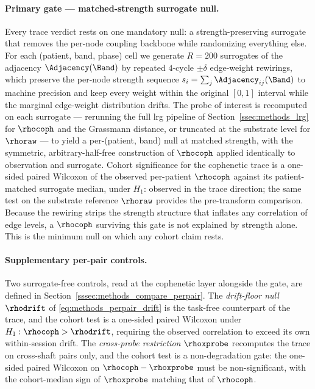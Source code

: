\paragraph{Primary gate --- matched-strength surrogate null.}
Every trace verdict rests on one mandatory null: a strength-preserving surrogate that removes the per-node coupling backbone while randomizing everything else. For each (patient, band, phase) cell we generate \(R = 200\) surrogates of the adjacency \(\Adjacency(\Band)\) by repeated \(4\)-cycle \(\pm\delta\) edge-weight rewirings, which preserve the per-node strength sequence \(s_{i} = \sum_{j} \Adjacency_{ij}(\Band)\) to machine precision and keep every weight within the original \([0, 1]\) interval while the marginal edge-weight distribution drifts. The probe of interest is recomputed on each surrogate --- rerunning the full \gls{lrg} pipeline of Section~\ref{ssec:methods_lrg} for \(\rhocoph\) and the Grassmann distance, or truncated at the substrate level for \(\rhoraw\) --- to yield a per-(patient, band) null at matched strength, with the symmetric, arbitrary-half-free construction of \(\rhocoph\) applied identically to observation and surrogate. Cohort significance for the cophenetic trace is a one-sided paired Wilcoxon of the observed per-patient \(\rhocoph\) against its patient-matched surrogate median, under \(H_{1}\): observed in the trace direction; the same test on the substrate reference \(\rhoraw\) provides the pre-transform comparison. Because the rewiring strips the strength structure that inflates any correlation of edge levels, a \(\rhocoph\) surviving this gate is not explained by strength alone. This is the minimum null on which any cohort claim rests.

\paragraph{Supplementary per-pair controls.}
Two surrogate-free controls, read at the cophenetic layer alongside the gate, are defined in Section~\ref{sssec:methods_compare_perpair}. The \emph{drift-floor null} \(\rhodrift\) of \eqref{eq:methods_perpair_drift} is the task-free counterpart of the trace, and the cohort test is a one-sided paired Wilcoxon under \(H_{1}: \rhocoph > \rhodrift\), requiring the observed correlation to exceed its own within-session drift. The \emph{cross-probe restriction} \(\rhoxprobe\) recomputes the trace on cross-shaft pairs only, and the cohort test is a non-degradation gate: the one-sided paired Wilcoxon on \(\rhocoph - \rhoxprobe\) must be non-significant, with the cohort-median sign of \(\rhoxprobe\) matching that of \(\rhocoph\).


